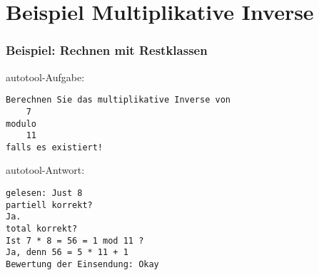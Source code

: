 \section{Beispiel Multiplikative Inverse}
\begin{frame}[fragile]
  \frametitle{Beispiel: Rechnen mit Restklassen}
  {\small
    autotool-Aufgabe: 
\begin{verbatim}
Berechnen Sie das multiplikative Inverse von
    7
modulo
    11
falls es existiert!
\end{verbatim}
    \pause\vfill


    autotool-Antwort:
\begin{verbatim}
gelesen: Just 8
partiell korrekt?
Ja.
total korrekt?
Ist 7 * 8 = 56 = 1 mod 11 ?
Ja, denn 56 = 5 * 11 + 1
Bewertung der Einsendung: Okay
\end{verbatim}
  }
\end{frame}
